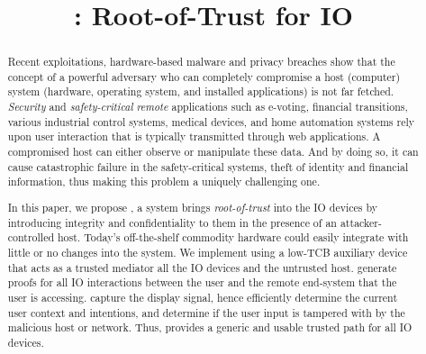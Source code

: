 \newif\ifpaper
\papertrue

\newif\ifccs
\ccstrue

\ifccs

\else

\fi



\newif\ifdesperatetime

\graphicspath{{images/}}


\title{\name: Root-of-Trust for IO}

\ifccs
\else
\maketitle
\fi

\begin{abstract}
 
Recent exploitations, hardware-based malware and privacy breaches show that the concept of a powerful adversary who can completely compromise a host (computer) system (hardware, operating system, and installed applications) is not far fetched. \emph{Security} and \emph{safety-critical} \emph{remote} applications such as e-voting, financial transitions, various industrial control systems, medical devices, and home automation systems rely upon user interaction that is typically transmitted through web applications. A compromised host can either observe or manipulate these data. And by doing so, it can cause catastrophic failure in the safety-critical systems, theft of identity and financial information, thus making this problem a uniquely challenging one.

In this paper, we propose \name, a system brings \emph{root-of-trust} into the IO devices by introducing integrity and confidentiality to them in the presence of an attacker-controlled host. Today's off-the-shelf commodity hardware could easily integrate \name with little or no changes into the system. We implement \name using a low-TCB auxiliary device that acts as a trusted mediator all the IO devices and the untrusted host. \name generate proofs for all IO interactions between the user and the remote end-system that the user is accessing. \name capture the display signal, hence efficiently determine the current user context and intentions, and determine if the user input is tampered with by the malicious host or network. Thus, \name provides a generic and usable trusted path for all IO devices.

\end{abstract}


\ifccs
\maketitle
\else
\fi


